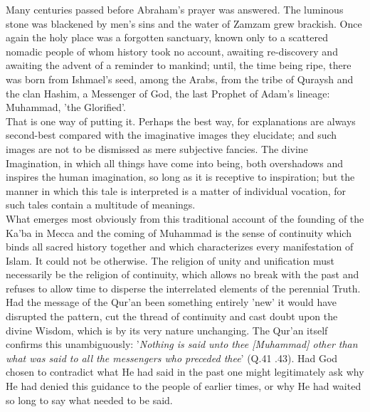 \documentclass[10pt, twoside]{book}
\begin{document}
Many centuries passed before Abraham's prayer was answered. The luminous stone was blackened by men's sins and the water of Zamzam grew brackish. Once again the holy place was a forgotten sanctuary, 
known only to a scattered nomadic people of whom history took no account, awaiting re\hyp{}discovery and 
awaiting the advent of a reminder to mankind; until, the time being ripe, there was born from 
Ishmael's seed, among the Arabs, from the tribe of Quraysh and the clan Hashim, a Messenger of God, 
the last Prophet of Adam's lineage: Muhammad, 'the Glorified'. \\

That is one way of putting it. Perhaps the best way, for explanations are always second\hyp{}best compared with the imaginative images they elucidate; and such images are not to be dismissed as mere 
subjective fancies. The divine Imagination, in which all things have come into being, both 
overshadows and inspires the human imagination, so long as it is receptive to inspiration; but the 
manner in which this tale is interpreted is a matter of individual vocation, for such tales contain a 
multitude of meanings. \\

What emerges most obviously from this traditional account of the founding of the Ka'ba in Mecca and 
the coming of Muhammad is the sense of continuity which binds all sacred history together and which 
characterizes every manifestation of Islam. It could not be otherwise. The religion of unity and 
unification must necessarily be the religion of continuity, which allows no break with the past and 
refuses to allow time to disperse the interrelated elements of the perennial Truth. Had the message 
of the Qur'an been something entirely 'new' it would have disrupted the pattern, cut the thread of 
continuity and cast doubt upon the divine Wisdom, which is by its very nature unchanging. The Qur'an 
itself confirms this unambiguously: '\emph{Nothing is said unto thee [Muhammad] other than what was said to all the messengers who preceded thee}' (Q.41 .43). Had God chosen to contradict what He had said in the past one might legitimately ask why He had denied this guidance to the people of earlier times, 
or why He had waited so long to say what needed to be said. \\
\end{document}
